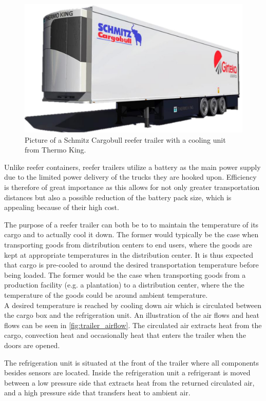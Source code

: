 \begin{figure}[h]
	\centering
	\includegraphics[width = 0.55\linewidth]{Graphics/3d_draw_trailer.jpg}
	\caption{Picture of a Schmitz Cargobull reefer trailer with a cooling unit from Thermo King.}
	\label{fig:trailer_picture}
\end{figure}

Unlike reefer containers, reefer trailers utilize a battery as the main power supply due to the limited power delivery of the trucks they are hooked upon. Efficiency is therefore of great importance as this allows for not only greater transportation distances but also a possible reduction of the battery pack size, which is appealing because of their high cost.

The purpose of a reefer trailer can both be to to maintain the temperature of its cargo and to actually cool it down. The former would typically be the case when transporting goods from distribution centers to end users, where the goods are kept at appropriate temperatures in the distribution center. It is thus expected that cargo is pre-cooled to around the desired transportation temperature before being loaded.
The former would be the case when transporting goods from a production facility (e.g. a plantation) to a distribution center, where the the temperature of the goods could be around ambient temperature.\\

A desired temperature is reached by cooling down air which is circulated between the cargo box and the refrigeration unit. An illustration of the air flows and heat flows can be seen in \cref{fig:trailer_airflow}. The circulated air extracts heat from the cargo, convection heat and occasionally heat that enters the trailer when the doors are opened.

The refrigeration unit is situated at the front of the trailer where all components besides sensors are located. Inside the refrigeration unit a refrigerant is moved between a low pressure side that extracts heat from the returned circulated air, and a high pressure side that transfers heat to ambient air. 

